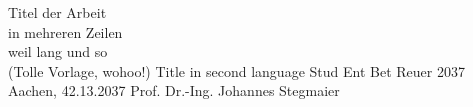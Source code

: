 \documentclass[12pt,a4paper,titlepage,twoside,numbers=noenddot,BCOR=12mm]{scrreprt}
\begin{document}

\pagestyle{scrheadings}
\renewcommand{\chaptermark}[1]{\markboth{#1}{#1}}
\renewcommand{\sectionmark}[1]{\markright{\thesection\ \ #1}}

%
%

\addtolength{\topmargin}{0.5cm}
\addtolength{\textwidth}{5cm}
\pagestyle{empty}
             {Titel der Arbeit	\\		
						in mehreren Zeilen		\\				
						weil lang und so			\\			
						(Tolle Vorlage, wohoo!)}     %
             {Title in second language}      %
             {Stud Ent}                     %
             {Bet Reuer}          %
             {2037}                                  %
             {Aachen, 42.13.2037} 	%
             {Prof. Dr.-Ing. Johannes Stegmaier} %

\addtolength{\textwidth}{-5cm}
\cleardoublepage


%
%

\pagestyle{plain}
\tableofcontents
\cleardoublepage


\pagestyle{empty}
\begingroup
\let\cleardoublepage\relax
\let\clearpage\relax
{}
\listoffigures
{}
\listoftables
{}
\listoflistings
\endgroup
\cleardoublepage

\pagestyle{empty}

\cleardoublepage 
\end{document}
